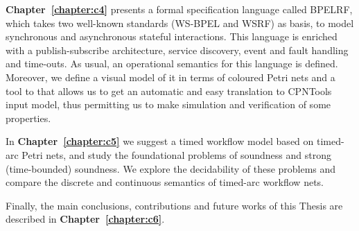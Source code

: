 \textbf{Chapter~\ref{chapter:c4}} presents a formal specification language called BPELRF, which takes two well-known standards (WS-BPEL and WSRF) as basis, to model synchronous and asynchronous stateful interactions. This language is enriched with a publish-subscribe architecture, service discovery, event and fault handling and time-outs. As usual, an operational semantics for this language is defined. Moreover, we define a visual model of it in terms of coloured Petri nets and a tool to that allows us to get an automatic and easy translation to CPNTools input model, thus permitting us to make simulation and verification of some properties.

In \textbf{Chapter~\ref{chapter:c5}} we suggest a timed workflow model based on timed-arc Petri nets, and study
the foundational problems of soundness and strong (time-bounded) soundness.
We explore the decidability of these problems
and compare the discrete and continuous semantics of timed-arc
workflow nets. 

Finally, the main conclusions, contributions and future works of this Thesis are described in \textbf{Chapter~\ref{chapter:c6}}.